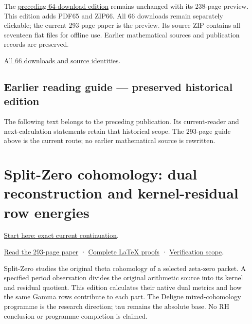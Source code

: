 \documentclass[
]{article}
\begin{document}
The \href{https://doi.org/10.5281/zenodo.22760013}{preceding 64-download
edition} remains unchanged with its 238-page preview. This edition adds
PDF65 and ZIP66. All 66 downloads remain separately clickable; the
current 293-page paper is the preview. Its source ZIP contains all
seventeen flat files for offline use. Earlier mathematical sources and
publication records are preserved.

\href{calculation_edition_20260915_dual_metric/README.md}{All 66
downloads and source identities}.

\subsection{Earlier reading guide --- preserved historical
edition}\label{earlier-reading-guide-preserved-historical-edition-4}

The following text belongs to the preceding publication. Its
current-reader and next-calculation statements retain that historical
scope. The 293-page guide above is the current route; no earlier
mathematical source is rewritten.

\section{Split-Zero cohomology: dual reconstruction and kernel-residual
row
energies}\label{split-zero-cohomology-dual-reconstruction-and-kernel-residual-row-energies-1}

\href{https://github.com/KokunoYumeto/zeta-function-research-reader/blob/main/workbenches/splitzero-tandem/continuations/20260915-dual-metric-continuation/00_CONTINUE_HERE.md}{Start
here: exact current continuation}.

\href{https://github.com/KokunoYumeto/zeta-function-research-reader/blob/main/workbenches/splitzero-tandem/continuations/20260915-dual-metric-continuation/15_CURRENT_MIXED_CONTROL_READER.pdf}{Read
the 293-page paper} ·
\href{https://github.com/KokunoYumeto/zeta-function-research-reader/blob/main/workbenches/splitzero-tandem/continuations/20260915-dual-metric-continuation/14_CURRENT_KERNEL_AND_MULTIPLICITY_PROOFS.tex}{Complete
LaTeX proofs} ·
\href{https://github.com/KokunoYumeto/zeta-function-research-reader/blob/main/workbenches/splitzero-tandem/continuations/20260915-dual-metric-continuation/12_VALIDATION.md}{Verification
scope}.

Split-Zero studies the original theta cohomology of a selected zeta-zero
packet. A specified period observation divides the original arithmetic
source into its kernel and residual quotient. This edition calculates
their native dual metrics and how the same Gamma rows contribute to each
part. The Deligne mixed-cohomology programme is the research direction;
tau remains the absolute base. No RH conclusion or programme completion
is claimed.
\end{document}
